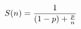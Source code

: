 \documentclass[preview]{standalone}
\begin{document}
\begin{align*}
\special{dvisvgm:raw <g id='unique000'>}S(n) = \frac{1}{(1 - p) + \frac{p}{n\special{dvisvgm:raw </g>}}}
\end{align*}
\end{document}
